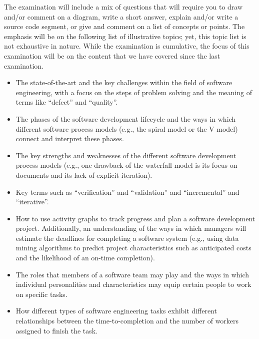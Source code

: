 \vspace*{-.05in}

\noindent The examination will include a mix of questions that will require you to draw and/or comment on a diagram,
write a short answer, explain and/or write a source code segment, or give and comment on a list of concepts or points.
The emphasis will be on the following list of illustrative topics; yet, this topic list is not exhaustive in nature.
While the examination is cumulative, the focus of this examination will be on the content that we have covered since the
last examination.

\vspace*{-.05in}
\begin{itemize}

  \itemsep 0in

  \item The state-of-the-art and the key challenges within the field of software engineering, with a focus on the steps
    of problem solving and the meaning of terms like ``defect'' and ``quality''.

  \item The phases of the software development lifecycle and the ways in which different software process models (e.g.,
    the spiral model or the V model) connect and interpret these phases.

  \item The key strengths and weaknesses of the different software development process models (e.g., one drawback of
    the waterfall model is its focus on documents and its lack of explicit iteration).

  \item Key terms such as ``verification'' and ``validation'' and ``incremental'' and ``iterative''.

  \item How to use activity graphs to track progress and plan a software development project. Additionally, an
    understanding of the ways in which managers will estimate the deadlines for completing a software system (e.g.,
    using data mining algorithms to predict project characteristics such as anticipated costs and the likelihood of an
    on-time completion).

  \item The roles that members of a software team may play and the ways in which individual personalities
    and characteristics may equip certain people to work on specific tasks.

  \item How different types of software engineering tasks exhibit different relationships between the time-to-completion
    and the number of workers assigned to finish the task.


\end{itemize}
